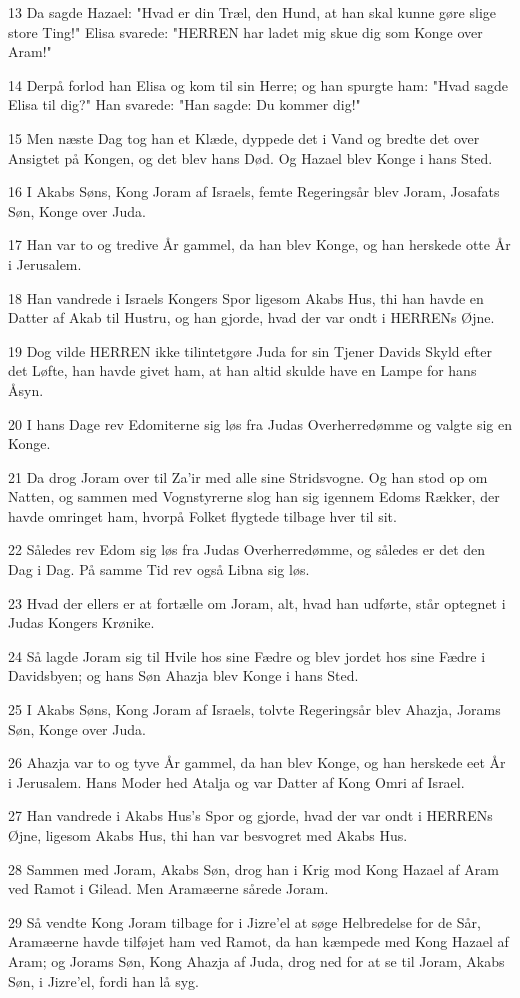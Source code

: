 \par 13 Da sagde Hazael: "Hvad er din Træl, den Hund, at han skal kunne gøre slige store Ting!" Elisa svarede: "HERREN har ladet mig skue dig som Konge over Aram!"
\par 14 Derpå forlod han Elisa og kom til sin Herre; og han spurgte ham: "Hvad sagde Elisa til dig?" Han svarede: "Han sagde: Du kommer dig!"
\par 15 Men næste Dag tog han et Klæde, dyppede det i Vand og bredte det over Ansigtet på Kongen, og det blev hans Død. Og Hazael blev Konge i hans Sted.
\par 16 I Akabs Søns, Kong Joram af Israels, femte Regeringsår blev Joram, Josafats Søn, Konge over Juda.
\par 17 Han var to og tredive År gammel, da han blev Konge, og han herskede otte År i Jerusalem.
\par 18 Han vandrede i Israels Kongers Spor ligesom Akabs Hus, thi han havde en Datter af Akab til Hustru, og han gjorde, hvad der var ondt i HERRENs Øjne.
\par 19 Dog vilde HERREN ikke tilintetgøre Juda for sin Tjener Davids Skyld efter det Løfte, han havde givet ham, at han altid skulde have en Lampe for hans Åsyn.
\par 20 I hans Dage rev Edomiterne sig løs fra Judas Overherredømme og valgte sig en Konge.
\par 21 Da drog Joram over til Za'ir med alle sine Stridsvogne. Og han stod op om Natten, og sammen med Vognstyrerne slog han sig igennem Edoms Rækker, der havde omringet ham, hvorpå Folket flygtede tilbage hver til sit.
\par 22 Således rev Edom sig løs fra Judas Overherredømme, og således er det den Dag i Dag. På samme Tid rev også Libna sig løs.
\par 23 Hvad der ellers er at fortælle om Joram, alt, hvad han udførte, står optegnet i Judas Kongers Krønike.
\par 24 Så lagde Joram sig til Hvile hos sine Fædre og blev jordet hos sine Fædre i Davidsbyen; og hans Søn Ahazja blev Konge i hans Sted.
\par 25 I Akabs Søns, Kong Joram af Israels, tolvte Regeringsår blev Ahazja, Jorams Søn, Konge over Juda.
\par 26 Ahazja var to og tyve År gammel, da han blev Konge, og han herskede eet År i Jerusalem. Hans Moder hed Atalja og var Datter af Kong Omri af Israel.
\par 27 Han vandrede i Akabs Hus's Spor og gjorde, hvad der var ondt i HERRENs Øjne, ligesom Akabs Hus, thi han var besvogret med Akabs Hus.
\par 28 Sammen med Joram, Akabs Søn, drog han i Krig mod Kong Hazael af Aram ved Ramot i Gilead. Men Aramæerne sårede Joram.
\par 29 Så vendte Kong Joram tilbage for i Jizre'el at søge Helbredelse for de Sår, Aramæerne havde tilføjet ham ved Ramot, da han kæmpede med Kong Hazael af Aram; og Jorams Søn, Kong Ahazja af Juda, drog ned for at se til Joram, Akabs Søn, i Jizre'el, fordi han lå syg.

